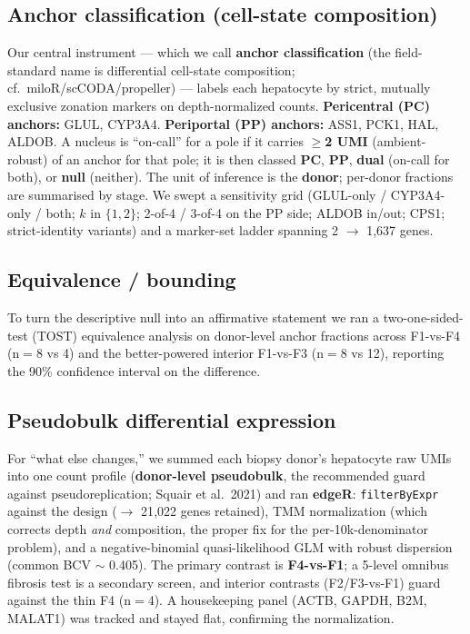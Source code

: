 \documentclass[11pt,a4paper]{article}
\begin{document}
\subsection{Anchor classification (cell-state composition)}

Our central instrument --- which we call \textbf{anchor classification} (the field-standard name is differential cell-state composition; cf.\ miloR/scCODA/propeller) --- labels each hepatocyte by strict, mutually exclusive zonation markers on depth-normalized counts. \textbf{Pericentral (PC) anchors:} GLUL, CYP3A4. \textbf{Periportal (PP) anchors:} ASS1, PCK1, HAL, ALDOB. A nucleus is ``on-call'' for a pole if it carries \textbf{$\ge$2 UMI} (ambient-robust) of an anchor for that pole; it is then classed \textbf{PC}, \textbf{PP}, \textbf{dual} (on-call for both), or \textbf{null} (neither). The unit of inference is the \textbf{donor}; per-donor fractions are summarised by stage. We swept a sensitivity grid (GLUL-only / CYP3A4-only / both; $k$ in $\{1,2\}$; 2-of-4 / 3-of-4 on the PP side; ALDOB in/out; CPS1; strict-identity variants) and a marker-set ladder spanning 2 $\to$ 1{,}637 genes.

\subsection{Equivalence / bounding}

To turn the descriptive null into an affirmative statement we ran a two-one-sided-test (TOST) equivalence analysis on donor-level anchor fractions across F1-vs-F4 (n$=$8 vs 4) and the better-powered interior F1-vs-F3 (n$=$8 vs 12), reporting the 90\% confidence interval on the difference.

\subsection{Pseudobulk differential expression}

For ``what else changes,'' we summed each biopsy donor's hepatocyte raw UMIs into one count profile (\textbf{donor-level pseudobulk}, the recommended guard against pseudoreplication; Squair et al.\ 2021) and ran \textbf{edgeR}: \texttt{filterByExpr} against the design ($\to$ 21{,}022 genes retained), TMM normalization (which corrects depth \emph{and} composition, the proper fix for the per-10k-denominator problem), and a negative-binomial quasi-likelihood GLM with robust dispersion (common BCV $\sim$ 0.405). The primary contrast is \textbf{F4-vs-F1}; a 5-level omnibus fibrosis test is a secondary screen, and interior contrasts (F2/F3-vs-F1) guard against the thin F4 (n$=$4). A housekeeping panel (ACTB, GAPDH, B2M, MALAT1) was tracked and stayed flat, confirming the normalization.
\end{document}
